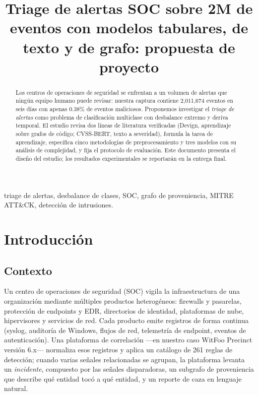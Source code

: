 \documentclass[conference]{IEEEtran}
\begin{document}
\title{Triage de alertas SOC sobre 2M de eventos con modelos tabulares, de texto y de grafo: propuesta de proyecto}

\author{
}

\maketitle

\begin{abstract}
Los centros de operaciones de seguridad se enfrentan a un volumen de alertas que ning\'un equipo humano puede revisar: nuestra captura contiene 2,011,674 eventos en seis d\'ias con apenas 0.38\% de eventos maliciosos. Proponemos investigar el \emph{triage de alertas} como problema de clasificaci\'on multiclase con desbalance extremo y deriva temporal. El estudio revisa dos l\'ineas de literatura verificadas (Devign, aprendizaje sobre grafos de c\'odigo; CVSS-BERT, texto a severidad), formula la tarea de aprendizaje, especifica cinco metodolog\'ias de preprocesamiento y tres modelos con su an\'alisis de complejidad, y fija el protocolo de evaluaci\'on. Este documento presenta el dise\~no del estudio; los resultados experimentales se reportar\'an en la entrega final.
\end{abstract}

\begin{IEEEkeywords}
triage de alertas, desbalance de clases, SOC, grafo de proveniencia, MITRE ATT\&CK, detecci\'on de intrusiones.
\end{IEEEkeywords}

\section{Introducci\'on}
\label{sec:intro}

\subsection{Contexto}
Un centro de operaciones de seguridad (SOC) vigila la infraestructura de una organizaci\'on mediante m\'ultiples productos heterog\'eneos: firewalls y pasarelas, protecci\'on de endpoints y EDR, directorios de identidad, plataformas de nube, hipervisores y servicios de red. Cada producto emite registros de forma continua (syslog, auditor\'ia de Windows, flujos de red, telemetr\'ia de endpoint, eventos de autenticaci\'on). Una plataforma de correlaci\'on —en nuestro caso WitFoo Precinct versión 6.x— normaliza esos registros y aplica un cat\'alogo de 261 reglas de detecci\'on; cuando varias se\~nales relacionadas se agrupan, la plataforma levanta un \emph{incidente}, compuesto por las se\~nales disparadoras, un subgrafo de proveniencia que describe qu\'e entidad toc\'o a qu\'e entidad, y un reporte de caza en lenguaje natural.
\end{document}
